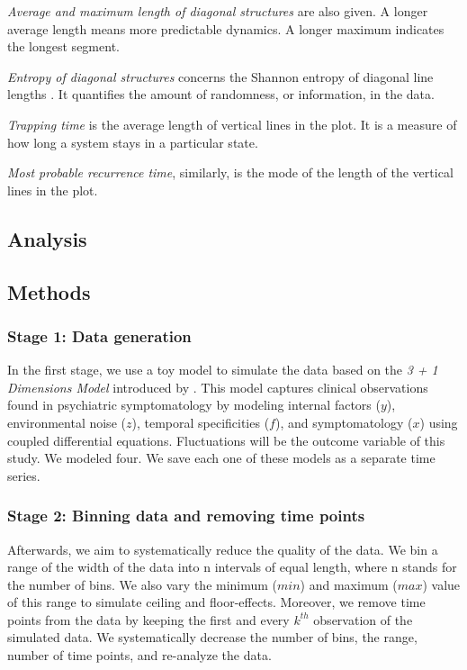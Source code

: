 \documentclass[utf8]{FrontiersinVancouver}
\begin{document}
\textit{Average and maximum length of diagonal structures} are also given. A longer average length means more predictable dynamics. A longer maximum indicates the longest segment.

\textit{Entropy of diagonal structures} concerns the Shannon entropy of diagonal line lengths \citep{kraemerRecurrenceThresholdSelection2018}. It quantifies the amount of randomness, or information, in the data.

\textit{Trapping time} is the average length of vertical lines in the plot. It is a measure of how long a system stays in a particular state.

\textit{Most probable recurrence time}, similarly, is the mode of the length of the vertical lines in the plot. 

\subsection{Analysis}

\subsection{Methods}

\subsubsection{Stage 1: Data generation}

In the first stage, we use a toy model to simulate the data based on the \textit{3 + 1 Dimensions Model} introduced by \citep{gauldDynamicalSystemsComputational2023}. This model captures clinical observations found in psychiatric symptomatology by modeling internal factors ($y$), environmental noise ($z$), temporal specificities ($f$), and symptomatology ($x$) using coupled differential equations. Fluctuations  will be the outcome variable of this study. We modeled four. We save each one of these models as a separate time series. 

\subsubsection{Stage 2: Binning data and removing time points}

Afterwards, we aim to systematically reduce the quality of the data. We bin a range of the width of the data into n intervals of equal length, where n stands for the number of bins.  We also vary the minimum ($min$) and maximum ($max$) value of this range to simulate ceiling and floor-effects. Moreover, we remove time points from the data by keeping the first and every $k^{th}$ observation of the simulated data. We systematically decrease the number of bins, the range, number of time points, and re-analyze the data.
\end{document}
